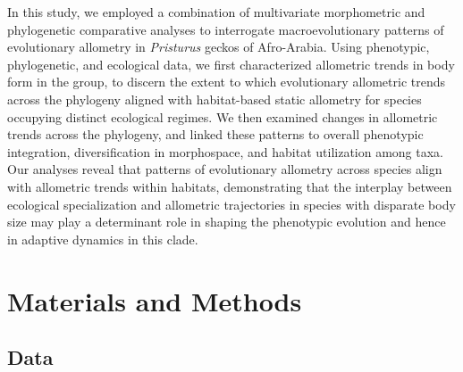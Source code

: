 \documentclass[
  11pt,
]{article}
\begin{document}
In this study, we employed a combination of multivariate morphometric
and phylogenetic comparative analyses to interrogate macroevolutionary
patterns of evolutionary allometry in \emph{Pristurus} geckos of
Afro-Arabia. Using phenotypic, phylogenetic, and ecological data, we
first characterized allometric trends in body form in the group, to
discern the extent to which evolutionary allometric trends across the
phylogeny aligned with habitat-based static allometry for species
occupying distinct ecological regimes. We then examined changes in
allometric trends across the phylogeny, and linked these patterns to
overall phenotypic integration, diversification in morphospace, and
habitat utilization among taxa. Our analyses reveal that patterns of
evolutionary allometry across species align with allometric trends
within habitats, demonstrating that the interplay between ecological
specialization and allometric trajectories in species with disparate
body size may play a determinant role in shaping the phenotypic
evolution and hence in adaptive dynamics in this clade.

\hypertarget{materials-and-methods}{%
\section{Materials and Methods}\label{materials-and-methods}}

\hypertarget{data}{%
\subsection{Data}\label{data}}
\end{document}
